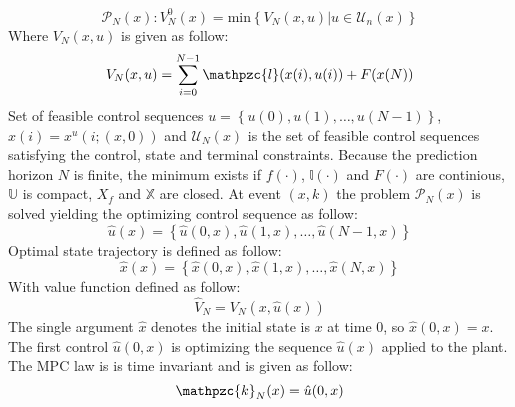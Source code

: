 \begin{equation}\label{eq:m19}
    \mathscr{P}_N(x):V_N^0(x)= \text{min}\left\{V_N(x,u)|u\in\mathscr{U}_n(x)\right\}
\end{equation}
\noindent Where $V_N(x,u)$ is given as follow:
\begin{equation}\label{eq:m110}
    V_N(x,u)= \sum_{i=0}^{N-1} \mathpzc{l}(x(i),u(i)) + F(x(N))
\end{equation}
\noindent Set of feasible control sequences $u=\left\{u(0),u(1),\dots,u(N-1)\right\}$, $x(i)=x^u(i;(x,0))$ and $\mathscr{U}_N(x)$ is the set of feasible control sequences satisfying the control, state and terminal constraints. Because the prediction horizon $N$ is finite, the minimum exists if $f(\cdot)$, $\mathbb{l}(\cdot)$ and $F(\cdot)$ are continious, $\mathbb{U}$ is compact, $X_f$ and $\mathbb{X}$ are closed. At event $(x,k)$ the problem $\mathscr{P}_N(x)$ is solved yielding the optimizing control sequence as follow:
\begin{equation}\label{eq:m111}
    \hat{u}(x)=\left\{\hat{u}(0,x),\hat{u}(1,x),\dots,\hat{u}(N-1,x)\right\}
\end{equation}
\noindent Optimal state trajectory is defined as follow:
\begin{equation}\label{eq:m112}
    \hat{x}(x)=\left\{\hat{x}(0,x),\hat{x}(1,x),\dots,\hat{x}(N,x)\right\}
\end{equation}
\noindent With value function defined as follow:
\begin{equation}\label{eq:m113}
    \hat{V}_N = V_N(x,\hat{u}(x))
\end{equation}
\noindent The single argument $\hat{x}$ denotes the initial state is $x$ at time $0$, so $\hat{x}(0,x)=x$. The first control $\hat{u}(0,x)$ is optimizing the sequence $\hat{u}(x)$ applied to the plant. The MPC law is is time invariant and is given as follow:
\begin{equation}\label{eq:m114}
    \mathpzc{k}_N(x)=\hat{u}(0,x)
\end{equation}
